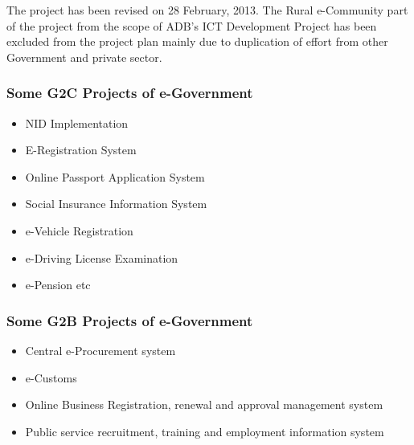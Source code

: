 The project has been revised on 28 February, 2013. The Rural e-Community part of the project from the scope of ADB’s ICT Development Project has been excluded from the project plan mainly due to duplication of effort from other Government and private sector.

\subsubsection*{Some G2C Projects of e-Government}

\begin{itemize}
	\item NID Implementation
	\item E-Registration System
	\item Online Passport Application System
	\item Social Insurance Information System
	\item e-Vehicle Registration
	\item e-Driving License  Examination
	\item e-Pension etc
\end{itemize}

\subsubsection*{Some G2B Projects of e-Government}
\begin{itemize}
	\item Central e-Procurement system
	\item e-Customs 
	\item Online Business Registration, renewal and approval management system 
	\item Public service recruitment, training and employment information system
\end{itemize}

